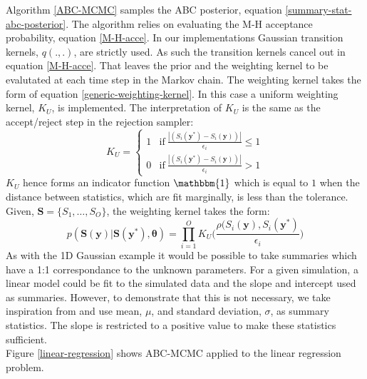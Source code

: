 Algorithm \ref{ABC-MCMC} samples the ABC posterior, equation \ref{summary-stat-abc-posterior}. The algorithm relies on evaluating the M-H acceptance probability, equation \ref{M-H-acce}. In our implementations Gaussian transition kernels, $q(.,.)$, are strictly used. As such the transition kernels cancel out in equation \ref{M-H-acce}. That leaves the prior and the weighting kernel to be evalutated at each time step in the Markov chain. The weighting kernel takes the form of equation \ref{generic-weighting-kernel}. In this case a uniform weighting kernel, $K_U$, is implemented. The interpretation of $K_U$ is the same as the accept/reject step in the rejection sampler: 
\begin{equation}
	K_U = 
	\begin{cases}
		1 & \text{if}\ 	\frac{|(S_i(\bm{y^*}) - S_i(\bm{y}))|}				{\epsilon_i} \leq 1\\
		0 & \text{if}\ \frac{|(S_i(\bm{y^*}) - S_i(\bm{y}))|}				{\epsilon_i} > 1
	\end{cases}
\end{equation}
$K_U$ hence forms an indicator function $\mathbbm{1}$ which is equal to $1$ when the distance between statistics, which are fit marginally, is less than the tolerance. Given, $\bm{S} = \{S_1,\dots,S_O\}$, the weighting kernel takes the form:
\begin{equation}
	p(\bm{S}(\bm{y})|\bm{S}(\bm{y^*}),\bm{\theta}) = \prod_{i = 1}^{O} K_U\Big(\frac{\rho(S_i(\bm{y}),S_i(\bm{y^*})}{\epsilon_i}\Big)
	\label{weight-kernel}
\end{equation}
\noindent
As with the 1D Gaussian example it would be possible to take summaries which have a 1:1 correspondance to the unknown parameters. For a given simulation, a linear model could be fit to the simulated data and the slope and intercept used as summaries. However, to demonstrate that this is not necessary, we take inspiration from \citet{vrugt2013toward} and use mean, $\mu$, and standard deviation, $\sigma$, as summary statistics. The slope is restricted to a positive value to make these statistics sufficient. \\

Figure \ref{linear-regression} shows ABC-MCMC applied to the linear regression problem. \\

